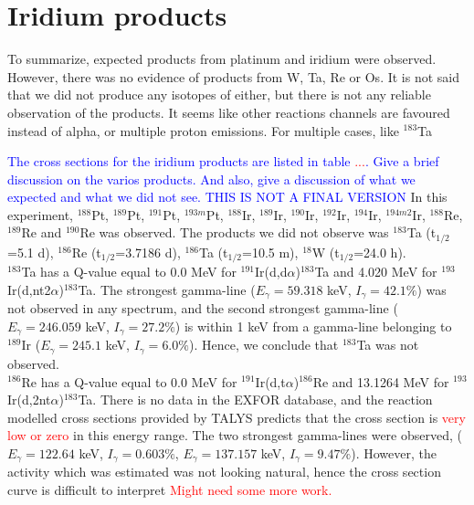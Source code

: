 \documentclass[a4paper,11pt,twoside]{book}
\begin{document}
\section{Iridium products}

To summarize, expected products from platinum and iridium were observed. However, there was no evidence of products from W, Ta, Re or Os. It is not said that we did not produce any isotopes of either, but there is not any reliable observation of the products. It seems like other reactions channels are favoured instead of alpha, or multiple proton emissions. For multiple cases, like $^{183}$Ta

\noindent \textcolor{blue}{The cross sections for the iridium products are listed in table \textcolor{red}{...}. Give a brief discussion on the varios products. And also, give a discussion of what we expected and what we did not see. THIS IS NOT A FINAL VERSION } In this experiment, $^{188}$Pt, $^{189}$Pt, $^{191}$Pt, $^{193m}$Pt, $^{188}$Ir, $^{189}$Ir, $^{190}$Ir, $^{192}$Ir, $^{194}$Ir, $^{194m2}$Ir, $^{188}$Re, $^{189}$Re and $^{190}$Re was observed. The products we did not observe was $^{183}$Ta (t$_{1/2}$=5.1 d), $^{186}$Re (t$_{1/2}$=3.7186 d), $^{186}$Ta (t$_{1/2}$=10.5 m), $^{18}$W (t$_{1/2}$=24.0 h). \\

\noindent $^{183}$Ta has a Q-value equal to 0.0 MeV for $^{191}$Ir(d,d$\alpha$)$^{183}$Ta and 4.020 MeV for $^{193}$Ir(d,nt2$\alpha$)$^{183}$Ta. The strongest gamma-line ($E_\gamma=59.318$ keV, $I_\gamma=42.1\%$) was not observed in any spectrum, and the second strongest gamma-line ($E_\gamma=246.059$ keV, $I_\gamma=27.2\%$) is within 1 keV from a gamma-line belonging to $^{189}$Ir ($E_\gamma=245.1$ keV, $I_\gamma=6.0\%$). Hence, we conclude that $^{183}$Ta was not observed. \\

\noindent $^{186}$Re has a Q-value equal to 0.0 MeV for $^{191}$Ir(d,t$\alpha$)$^{186}$Re and 13.1264 MeV for $^{193}$Ir(d,2nt$\alpha$)$^{183}$Ta. There is no data in the EXFOR database, and the reaction modelled cross sections provided by TALYS predicts that the cross section is \textcolor{red}{very low or zero} in this energy range. The two strongest gamma-lines were observed, ($E_\gamma=122.64$ keV, $I_\gamma=0.603\%$, $E_\gamma=137.157$ keV, $I_\gamma=9.47\%$). However, the activity which was estimated was not looking natural, hence the cross section curve is difficult to interpret \textcolor{red}{Might need some more work.} \\ 
\end{document}
